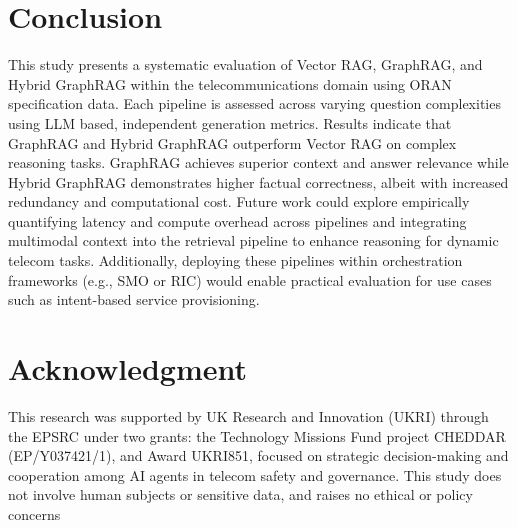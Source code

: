 \documentclass[10pt, conference]{IEEEtran}
\begin{document}
\section{Conclusion}
This study presents a systematic evaluation of Vector RAG, GraphRAG, and Hybrid GraphRAG within the telecommunications domain using ORAN specification data. 
Each pipeline is assessed across varying question complexities using LLM based, independent generation metrics. Results indicate that GraphRAG and Hybrid GraphRAG outperform Vector RAG on complex reasoning tasks. GraphRAG achieves superior context and answer relevance while Hybrid GraphRAG demonstrates higher factual correctness, albeit with increased redundancy and computational cost. Future work could explore  empirically quantifying latency and compute overhead across pipelines and integrating multimodal context into the retrieval pipeline to enhance reasoning for dynamic telecom tasks. Additionally, deploying these pipelines within orchestration frameworks (e.g., SMO or RIC) would enable practical evaluation for use cases such as intent-based service provisioning.

\section{Acknowledgment}
This research was supported by UK Research and Innovation (UKRI) through the EPSRC under two grants: the Technology Missions Fund project CHEDDAR (EP/Y037421/1), and Award UKRI851, focused on strategic decision-making and cooperation among AI agents in telecom safety and governance. This study does not involve human subjects or sensitive data, and raises no ethical or policy concerns



\end{document}
